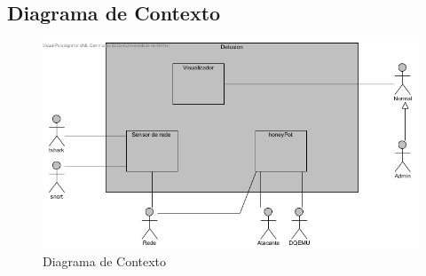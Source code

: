 \subsection{Diagrama de Contexto}

	\begin{figure}[!htb]
		\centering
		\includegraphics[scale=0.8]{images/DiagramaContexto}
		\caption{Diagrama de Contexto}
	\end{figure}

